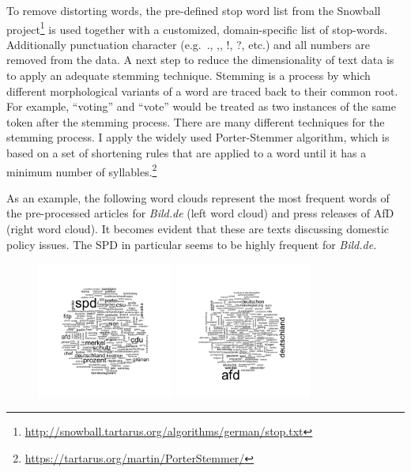 \documentclass[
]{article}
\begin{document}
To remove distorting words, the pre-defined stop word list from the
Snowball project\footnote{\url{http://snowball.tartarus.org/algorithms/german/stop.txt}}
is used together with a customized, domain-specific list of stop-words.
Additionally punctuation character (e.g.~., ,, !, ?, etc.) and all
numbers are removed from the data. A next step to reduce the
dimensionality of text data is to apply an adequate stemming technique.
Stemming is a process by which different morphological variants of a
word are traced back to their common root. For example, ``voting'' and
``vote'' would be treated as two instances of the same token after the
stemming process. There are many different techniques for the stemming
process. I apply the widely used Porter-Stemmer algorithm, which is
based on a set of shortening rules that are applied to a word until it
has a minimum number of syllables.\footnote{\url{https://tartarus.org/martin/PorterStemmer/}}

As an example, the following word clouds represent the most frequent
words of the pre-processed articles for \emph{Bild.de} (left word cloud)
and press releases of AfD (right word cloud). It becomes evident that
these are texts discussing domestic policy issues. The SPD in particular
seems to be highly frequent for \emph{Bild.de}.

\begin{figure}\centering

\includegraphics[width=0.4\textwidth,height=\textheight]{../figs/wordcloud_bild.png}
\includegraphics[width=0.4\textwidth,height=\textheight]{../figs/wordcloud_afd.png}

\end{figure}
\end{document}
